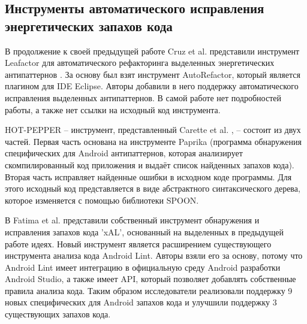 \subsection{Инструменты автоматического исправления \\ энергетических запахов кода}
В продолжение к своей предыдущей работе \cite{cruz2017performance} Cruz et al. представили инструмент Leafactor для автоматического рефакторинга выделенных энергетических антипаттернов \cite{cruz2018using}. За основу был взят инструмент AutoRefactor, который является плагином для IDE Eclipse. Авторы добавили в него поддержку автоматического исправления выделенных антипаттернов. В самой работе нет подробностей работы, а также нет ссылки на исходный код инструмента.

HOT-PEPPER -- инструмент, представленный Carette et al. \cite{carette2017investigating}, -- состоит из двух частей. Первая часть основана на инструменте Paprika (программа обнаружения специфических для Android антипаттернов, которая анализирует скомпилированный код приложения и выдаёт список найденных запахов кода). Вторая часть исправляет найденные ошибки в исходном коде программы. Для этого исходный код представляется в виде абстрактного синтаксического дерева, которое изменяется с помощью библиотеки SPOON. 

В \cite{fatima2020detection} Fatima et al. представили собственный инструмент обнаружения и исправления запахов кода 'xAL', основанный на выделенных в предыдущей работе идеях. Новый инструмент является расширением существующего инструмента анализа кода Android Lint. Авторы взяли его за основу, потому что Android Lint имеет интеграцию в официальную среду Android разработки Android Studio, а также имеет API, который позволяет добавлять собственные правила анализа кода. Таким образом исследователи реализовали поддержку 9 новых специфических для Android запахов кода и улучшили поддержку 3 существующих запахов кода.

